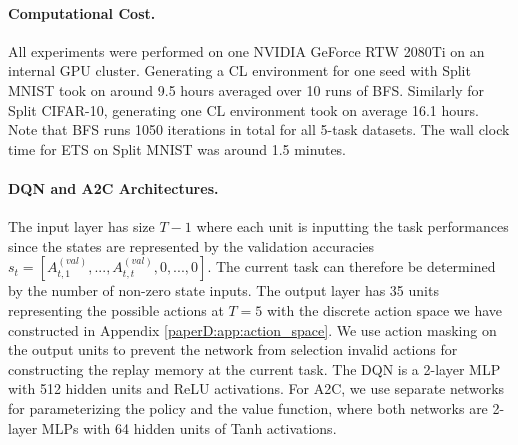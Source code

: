 \vspace{-3mm}
\paragraph{Computational Cost.} 
All experiments were performed on one NVIDIA GeForce RTW 2080Ti on an internal GPU cluster. Generating a CL environment for one seed with Split MNIST took on around 9.5 hours averaged over 10 runs of BFS. Similarly for Split CIFAR-10, generating one CL environment took on average 16.1 hours. Note that BFS runs 1050 iterations in total for all 5-task datasets. The wall clock time for ETS on Split MNIST was around 1.5 minutes. 


\vspace{-3mm}
\paragraph{DQN and A2C Architectures.}
The input layer has size $T-1$ where each unit is inputting the task performances since the states are represented by the validation accuracies $s_t = [A_{t, 1}^{(val)}, ..., A_{t, t}^{(val)}, 0, ..., 0]$. The current task can therefore be determined by the number of non-zero state inputs. 
The output layer has 35 units representing the possible actions at $T=5$ with the discrete action space we have constructed in Appendix \ref{paperD:app:action_space}. %
We use action masking on the output units to prevent the network from selection invalid actions for constructing the replay memory at the current task. The DQN is a 2-layer MLP with 512 hidden units and ReLU activations. For A2C, we use separate networks for parameterizing the policy and the value function, where both networks are 2-layer MLPs with 64 hidden units of Tanh activations. 

\vspace{-3mm}
